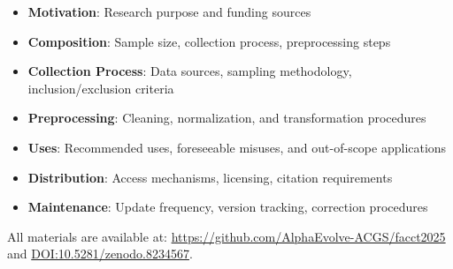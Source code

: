 \documentclass[manuscript,screen,review,anonymous,9pt]{acmart}
\begin{document}
\begin{itemize}
    \item \textbf{Motivation}: Research purpose and funding sources
    \item \textbf{Composition}: Sample size, collection process, preprocessing steps
    \item \textbf{Collection Process}: Data sources, sampling methodology, inclusion/exclusion criteria
    \item \textbf{Preprocessing}: Cleaning, normalization, and transformation procedures
    \item \textbf{Uses}: Recommended uses, foreseeable misuses, and out-of-scope applications
    \item \textbf{Distribution}: Access mechanisms, licensing, citation requirements
    \item \textbf{Maintenance}: Update frequency, version tracking, correction procedures
\end{itemize}
All materials are available at: \url{https://github.com/AlphaEvolve-ACGS/facct2025} and \url{DOI:10.5281/zenodo.8234567}.
\end{document}
